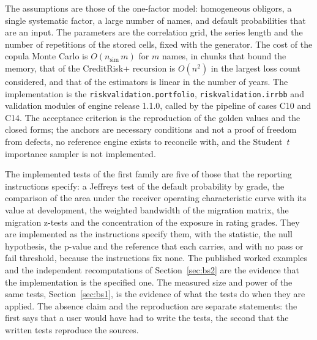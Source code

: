 The assumptions are those of the one-factor model: homogeneous obligors, a single systematic factor, a large number of names, and default probabilities that are an
input. The parameters are the correlation grid, the series length and the number of repetitions of the stored cells, fixed with the generator. The cost of the copula
Monte Carlo is $O(n_{\mathrm{sim}}\,m)$ for $m$ names, in chunks that bound the memory, that of the CreditRisk+ recursion is $O(n^{2})$ in the largest loss count considered,
and that of the estimators is linear in the number of years. The implementation is the \texttt{riskvalidation.portfolio}, \texttt{riskvalidation.irrbb} and validation
modules of engine release 1.1.0, called by the pipeline of cases C10 and C14. The acceptance criterion is the reproduction of the golden values and the closed
forms; the anchors are necessary conditions and not a proof of freedom from defects, no reference engine exists to reconcile with, and the Student~$t$ importance
sampler is not implemented.

The implemented tests of the first family are five of those that the reporting instructions specify: a Jeffreys test of the default probability by grade, the comparison of the area under the receiver operating characteristic curve with its value
at development, the weighted bandwidth of the migration matrix, the migration z-tests and the concentration of the exposure in rating grades. They are implemented as the instructions specify them, with the statistic, the null hypothesis, the p-value and
the reference that each carries, and with no pass or fail threshold, because the instructions fix none. The published worked examples and the independent recomputations of Section~\ref{sec:bs2} are the evidence that the
implementation is the specified one. The measured size and power of the same tests, Section~\ref{sec:bs1}, is the evidence of what the tests do when they are applied. The absence claim and the reproduction are separate
statements: the first says that a user would have had to write the tests, the second that the written tests reproduce the sources.

